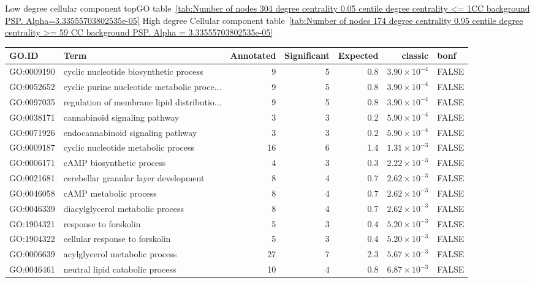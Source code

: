 Low degree cellular component topGO  table~\ref{tab:Number of nodes 304 degree centrality 0.05 centile  degree centrality <= 1CC background PSP. Alpha=3.33555703802535e-05}
High degree Cellular component
    table~\ref{tab:Number of nodes 174 degree centrality 0.95 centile  degree centrality >= 59 CC background PSP. Alpha = 3.33555703802535e-05}
\begin{table}[ht]
\centering
\begin{adjustbox}{max width=\textwidth}
\begin{tabular}{llrrrrl}
  \hline
GO.ID & Term & Annotated & Significant & Expected & classic & bonf \\ 
  \hline
GO:0009190 & cyclic nucleotide biosynthetic process & 9 & 5 & 0.8 & $3.90 \times 10^{-4}$ & FALSE \\ 
  GO:0052652 & cyclic purine nucleotide metabolic proce... & 9 & 5 & 0.8 & $3.90 \times 10^{-4}$ & FALSE \\ 
  GO:0097035 & regulation of membrane lipid distributio... & 9 & 5 & 0.8 & $3.90 \times 10^{-4}$ & FALSE \\ 
  GO:0038171 & cannabinoid signaling pathway & 3 & 3 & 0.2 & $5.90 \times 10^{-4}$ & FALSE \\ 
  GO:0071926 & endocannabinoid signaling pathway & 3 & 3 & 0.2 & $5.90 \times 10^{-4}$ & FALSE \\ 
  GO:0009187 & cyclic nucleotide metabolic process & 16 & 6 & 1.4 & $1.31 \times 10^{-3}$ & FALSE \\ 
  GO:0006171 & cAMP biosynthetic process & 4 & 3 & 0.3 & $2.22 \times 10^{-3}$ & FALSE \\ 
  GO:0021681 & cerebellar granular layer development & 8 & 4 & 0.7 & $2.62 \times 10^{-3}$ & FALSE \\ 
  GO:0046058 & cAMP metabolic process & 8 & 4 & 0.7 & $2.62 \times 10^{-3}$ & FALSE \\ 
  GO:0046339 & diacylglycerol metabolic process & 8 & 4 & 0.7 & $2.62 \times 10^{-3}$ & FALSE \\ 
  GO:1904321 & response to forskolin & 5 & 3 & 0.4 & $5.20 \times 10^{-3}$ & FALSE \\ 
  GO:1904322 & cellular response to forskolin & 5 & 3 & 0.4 & $5.20 \times 10^{-3}$ & FALSE \\ 
  GO:0006639 & acylglycerol metabolic process & 27 & 7 & 2.3 & $5.67 \times 10^{-3}$ & FALSE \\ 
  GO:0046461 & neutral lipid catabolic process & 10 & 4 & 0.8 & $6.87 \times 10^{-3}$ & FALSE \\ 

\end{tabular}
\end{adjustbox}
\end{table}
